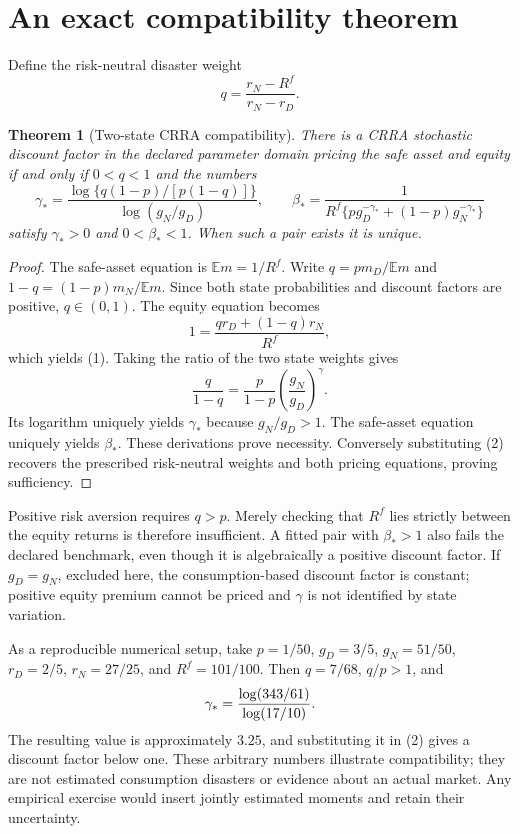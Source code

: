 \documentclass[11pt,a4paper]{article}
\newtheorem{theorem}{Theorem}[section]
\newcommand{\E}{\mathbb E}
\begin{document}
\section{An exact compatibility theorem}
Define the risk-neutral disaster weight
\[
 q=\frac{r_N-R^f}{r_N-r_D}.                               \tag{1}
\]
\begin{theorem}[Two-state CRRA compatibility]
There is a CRRA stochastic discount factor in the declared parameter domain pricing the safe asset and equity if and only if $0<q<1$ and the numbers
\[
 \gamma_*=
 \frac{\log\{q(1-p)/[p(1-q)]\}}{\log(g_N/g_D)},\qquad
 \beta_*=
 \frac{1}{R^f\{pg_D^{-\gamma_*}+(1-p)g_N^{-\gamma_*}\}}       \tag{2}
\]
satisfy $\gamma_*>0$ and $0<\beta_*<1$. When such a pair exists it is unique.
\end{theorem}
\begin{proof}
The safe-asset equation is $\E m=1/R^f$. Write
$q=pm_D/\E m$ and $1-q=(1-p)m_N/\E m$. Since both state probabilities and discount factors are positive, $q\in(0,1)$. The equity equation becomes
\[
 1=\frac{qr_D+(1-q)r_N}{R^f},
\]
which yields (1). Taking the ratio of the two state weights gives
\[
 \frac{q}{1-q}=\frac{p}{1-p}\left(\frac{g_N}{g_D}\right)^\gamma.
\]
Its logarithm uniquely yields $\gamma_*$ because $g_N/g_D>1$. The safe-asset equation uniquely yields $\beta_*$. These derivations prove necessity. Conversely substituting (2) recovers the prescribed risk-neutral weights and both pricing equations, proving sufficiency.
\end{proof}

Positive risk aversion requires $q>p$. Merely checking that $R^f$ lies strictly between the equity returns is therefore insufficient. A fitted pair with $\beta_*>1$ also fails the declared benchmark, even though it is algebraically a positive discount factor. If $g_D=g_N$, excluded here, the consumption-based discount factor is constant; positive equity premium cannot be priced and $\gamma$ is not identified by state variation.

As a reproducible numerical setup, take $p=1/50$, $g_D=3/5$, $g_N=51/50$, $r_D=2/5$, $r_N=27/25$, and $R^f=101/100$. Then $q=7/68$, $q/p>1$, and
\[
 \gamma_*={\log(343/61)\over\log(17/10)}.
\]
The resulting value is approximately $3.25$, and substituting it in (2) gives a discount factor below one. These arbitrary numbers illustrate compatibility; they are not estimated consumption disasters or evidence about an actual market. Any empirical exercise would insert jointly estimated moments and retain their uncertainty.
\end{document}
